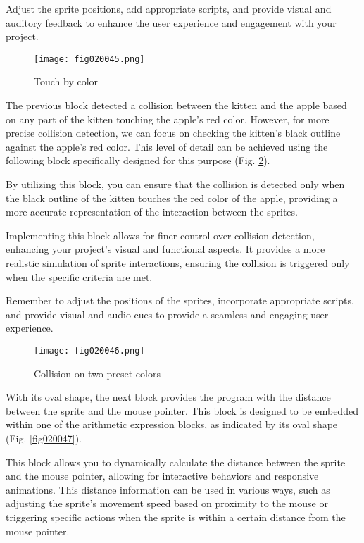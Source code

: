 Adjust the sprite positions, add appropriate scripts, and provide visual and auditory feedback to enhance the user experience and engagement with your project.

\begin{figure}[H]
   \centering
   \texttt{[image: fig020045.png]}
   \caption{Touch by color}
\label{fig020045}
\end{figure}

The previous block detected a collision between the kitten and the apple based on any part of the kitten touching the apple's red color. However, for more precise collision detection, we can focus on checking the kitten's black outline against the apple's red color. This level of detail can be achieved using the following block specifically designed for this purpose (Fig. \ref{fig020046}).

By utilizing this block, you can ensure that the collision is detected only when the black outline of the kitten touches the red color of the apple, providing a more accurate representation of the interaction between the sprites.

Implementing this block allows for finer control over collision detection, enhancing your project's visual and functional aspects. It provides a more realistic simulation of sprite interactions, ensuring the collision is triggered only when the specific criteria are met.

Remember to adjust the positions of the sprites, incorporate appropriate scripts, and provide visual and audio cues to provide a seamless and engaging user experience.

\begin{figure}[H]
   \centering
   \texttt{[image: fig020046.png]}
   \caption{Collision on two preset colors}
\label{fig020046}
\end{figure}

With its oval shape, the next block provides the program with the distance between the sprite and the mouse pointer. This block is designed to be embedded within one of the arithmetic expression blocks, as indicated by its oval shape (Fig. \ref{fig020047}).

This block allows you to dynamically calculate the distance between the sprite and the mouse pointer, allowing for interactive behaviors and responsive animations. This distance information can be used in various ways, such as adjusting the sprite's movement speed based on proximity to the mouse or triggering specific actions when the sprite is within a certain distance from the mouse pointer.

